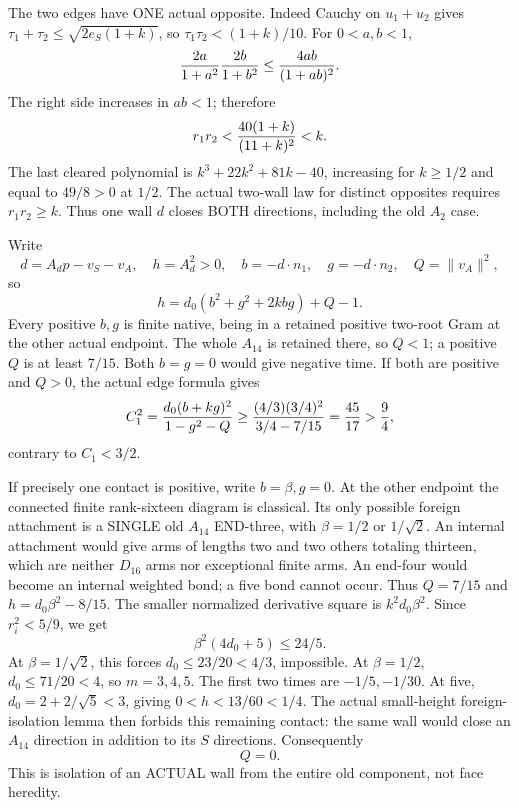 The two edges have ONE actual opposite.
Indeed Cauchy on \(u_1+u_2\) gives
\(\tau_1+\tau_2\le\sqrt{2e_S(1+k)}\),
so \(\tau_1\tau_2<(1+k)/10\).
For \(0<a,b<1\),
\[
 {2a\over1+a^2}{2b\over1+b^2}
          \le {4ab\over(1+ab)^2}.
\]
The right side increases in \(ab<1\);
therefore
\[
                         r_1r_2<{40(1+k)\over(11+k)^2}<k .
\]
The last cleared polynomial is
\(k^3+22k^2+81k-40\), increasing for
\(k\ge1/2\) and equal to \(49/8>0\)
at \(1/2\).
The actual two-wall law for distinct
opposites requires \(r_1r_2\ge k\).
Thus one wall \(d\) closes BOTH directions,
including the old \(A_2\) case.

Write
\[
 d=A_dp-v_S-v_A,\quad h=A_d^2>0,\quad
 b=-d\cdot n_1,\quad g=-d\cdot n_2,\quad Q=\|v_A\|^2,
\]
so
\[
             h=d_0(b^2+g^2+2kbg)+Q-1 .
\]
Every positive \(b,g\) is finite native,
being in a retained positive two-root Gram
at the other actual endpoint.
The whole \(A_{14}\) is retained there,
so \(Q<1\); a positive \(Q\) is at least
\(7/15\).
Both \(b=g=0\) would give negative time.
If both are positive and \(Q>0\), the
actual edge formula gives
\[
 C_1^2={d_0(b+kg)^2\over1-g^2-Q}
       \ge{(4/3)(3/4)^2\over3/4-7/15}
       ={45\over17}>{9\over4},
\]
contrary to \(C_1<3/2\).

If precisely one contact is positive,
write \(b=\beta,g=0\).
At the other endpoint the connected finite
rank-sixteen diagram is classical.
Its only possible foreign attachment is
a SINGLE old \(A_{14}\) END-three, with
\(\beta=1/2\) or \(1/\sqrt2\).
An internal attachment would give arms
of lengths two and two others totaling
thirteen, which are neither \(D_{16}\)
arms nor exceptional finite arms.
An end-four would become an internal
weighted bond; a five bond cannot occur.
Thus \(Q=7/15\) and
\(h=d_0\beta^2-8/15\).
The smaller normalized derivative square is
\(k^2d_0\beta^2\).
Since \(r_i^2<5/9\), we get
\[
                          \beta^2(4d_0+5)\le24/5 .
\]
At \(\beta=1/\sqrt2\), this forces
\(d_0\le23/20<4/3\), impossible.
At \(\beta=1/2\), \(d_0\le71/20<4\),
so \(m=3,4,5\).
The first two times are \(-1/5,-1/30\).
At five, \(d_0=2+2/\sqrt5<3\), giving
\(0<h<13/60<1/4\).
The actual small-height foreign-isolation
lemma then forbids this remaining contact:
the same wall would close an \(A_{14}\)
direction in addition to its \(S\) directions.
Consequently
\[
                         Q=0 .
\tag{A14coreiso}\label{eq:arithA14spectatorisolated}
\]
This is isolation of an ACTUAL wall from
the entire old component, not face heredity.

